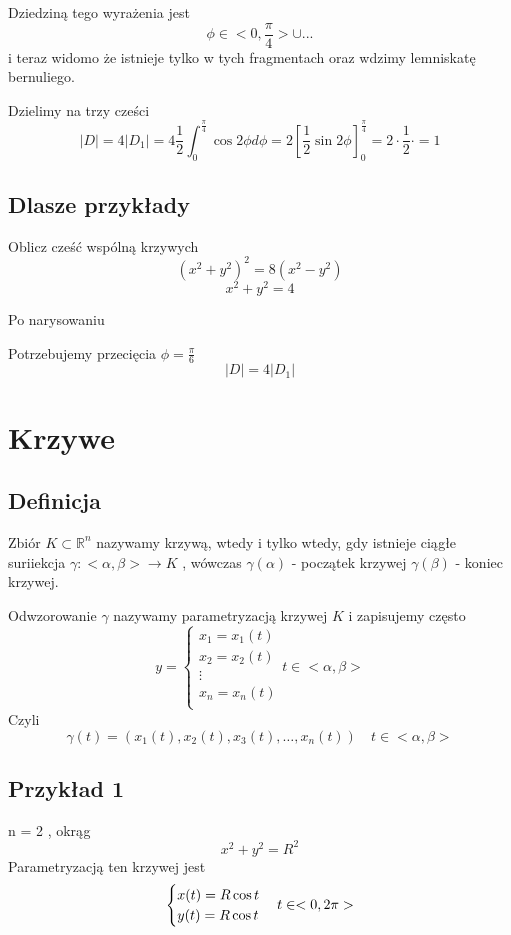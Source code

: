 \documentclass[11pt]{article}
\begin{document}
Dziedziną tego wyrażenia jest $$ \phi \in <0,\frac{\pi}{4}>  \cup ...$$
 i teraz widomo że istnieje tylko w tych fragmentach
 oraz wdzimy lemniskatę bernuliego.

Dzielimy na trzy cześci
$$ |D| = 4 |D_1| = 4\frac{1}{2}\int_0^{\frac{\pi}{4}} \cos{2\phi}d\phi = 2 \left[ \frac{1}{2}\sin{2\phi} \right]_0^{\frac{\pi}{4}} = 2 \cdot \frac{1}{2} \cdot = 1$$

\subsection{Dlasze przykłady}
Oblicz cześć wspólną krzywych
$$ (x^2 + y^2)^2 = 8(x^2 - y^2) $$
$$ x^2 + y^2 =4$$

Po narysowaniu 

Potrzebujemy przecięcia $\phi = \frac{\pi}{6}$
$$ |D| = 4 |D_1| $$

\section{Krzywe}
\subsection{Definicja}
Zbiór $ K \subset \mathbb{R}^n$ nazywamy krzywą, wtedy i tylko wtedy, gdy istnieje ciągłe suriiekcja $
\gamma : <\alpha,\beta> \to K$ , wówczas $\gamma(\alpha)$ - początek krzywej $ \gamma(\beta)$ - koniec krzywej.

Odwzorowanie $\gamma$ nazywamy parametryzacją krzywej $K$ i zapisujemy często $$ y = 
\begin{cases}
x_1 = x_1(t)\\
x_2 = x_2(t)\\
\vdots	\\
x_n = x_n(t)\\
\end{cases}
t \in <\alpha,\beta>$$
Czyli 
$$ \gamma(t) = (x_1(t),x_2(t),x_3(t), \ldots , x_n(t)) \quad t \in <\alpha,\beta> $$

\subsection{Przykład 1}
n = 2 , okrąg
$$ x^2 + y^2 = R^2 $$
Parametryzacją ten krzywej jest
$$
\begin{cases}
x(t) = R \cos{t} \\
y(t) = R \cos{t} \\
\end{cases}
\\
t \in <0,2\pi>
$$
\end{document}
